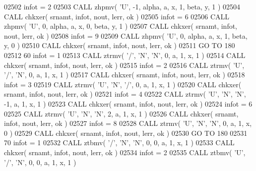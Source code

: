 \begin{DoxyCode}
02502       infot = 2
02503       \textcolor{keyword}{CALL }zhpmv( \textcolor{stringliteral}{'U'}, -1, alpha, a, x, 1, beta, y, 1 )
02504       \textcolor{keyword}{CALL }chkxer( srnamt, infot, nout, lerr, ok )
02505       infot = 6
02506       \textcolor{keyword}{CALL }zhpmv( \textcolor{stringliteral}{'U'}, 0, alpha, a, x, 0, beta, y, 1 )
02507       \textcolor{keyword}{CALL }chkxer( srnamt, infot, nout, lerr, ok )
02508       infot = 9
02509       \textcolor{keyword}{CALL }zhpmv( \textcolor{stringliteral}{'U'}, 0, alpha, a, x, 1, beta, y, 0 )
02510       \textcolor{keyword}{CALL }chkxer( srnamt, infot, nout, lerr, ok )
02511       \textcolor{keywordflow}{GO TO} 180
02512    60 infot = 1
02513       \textcolor{keyword}{CALL }ztrmv( \textcolor{stringliteral}{'/'}, \textcolor{stringliteral}{'N'}, \textcolor{stringliteral}{'N'}, 0, a, 1, x, 1 )
02514       \textcolor{keyword}{CALL }chkxer( srnamt, infot, nout, lerr, ok )
02515       infot = 2
02516       \textcolor{keyword}{CALL }ztrmv( \textcolor{stringliteral}{'U'}, \textcolor{stringliteral}{'/'}, \textcolor{stringliteral}{'N'}, 0, a, 1, x, 1 )
02517       \textcolor{keyword}{CALL }chkxer( srnamt, infot, nout, lerr, ok )
02518       infot = 3
02519       \textcolor{keyword}{CALL }ztrmv( \textcolor{stringliteral}{'U'}, \textcolor{stringliteral}{'N'}, \textcolor{stringliteral}{'/'}, 0, a, 1, x, 1 )
02520       \textcolor{keyword}{CALL }chkxer( srnamt, infot, nout, lerr, ok )
02521       infot = 4
02522       \textcolor{keyword}{CALL }ztrmv( \textcolor{stringliteral}{'U'}, \textcolor{stringliteral}{'N'}, \textcolor{stringliteral}{'N'}, -1, a, 1, x, 1 )
02523       \textcolor{keyword}{CALL }chkxer( srnamt, infot, nout, lerr, ok )
02524       infot = 6
02525       \textcolor{keyword}{CALL }ztrmv( \textcolor{stringliteral}{'U'}, \textcolor{stringliteral}{'N'}, \textcolor{stringliteral}{'N'}, 2, a, 1, x, 1 )
02526       \textcolor{keyword}{CALL }chkxer( srnamt, infot, nout, lerr, ok )
02527       infot = 8
02528       \textcolor{keyword}{CALL }ztrmv( \textcolor{stringliteral}{'U'}, \textcolor{stringliteral}{'N'}, \textcolor{stringliteral}{'N'}, 0, a, 1, x, 0 )
02529       \textcolor{keyword}{CALL }chkxer( srnamt, infot, nout, lerr, ok )
02530       \textcolor{keywordflow}{GO TO} 180
02531    70 infot = 1
02532       \textcolor{keyword}{CALL }ztbmv( \textcolor{stringliteral}{'/'}, \textcolor{stringliteral}{'N'}, \textcolor{stringliteral}{'N'}, 0, 0, a, 1, x, 1 )
02533       \textcolor{keyword}{CALL }chkxer( srnamt, infot, nout, lerr, ok )
02534       infot = 2
02535       \textcolor{keyword}{CALL }ztbmv( \textcolor{stringliteral}{'U'}, \textcolor{stringliteral}{'/'}, \textcolor{stringliteral}{'N'}, 0, 0, a, 1, x, 1 )

\end{DoxyCode}
